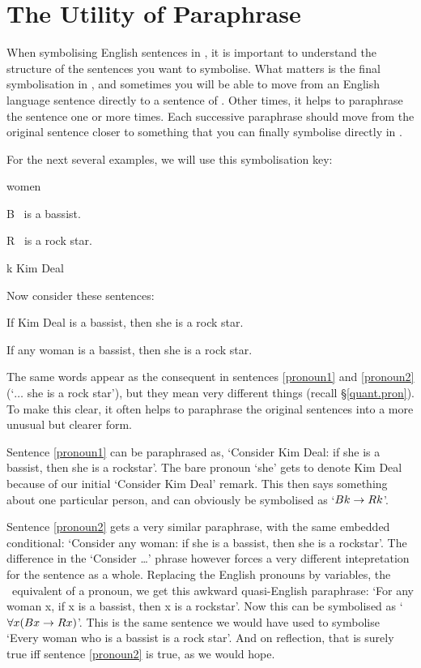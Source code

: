 \section{The Utility of Paraphrase}
When symbolising English sentences in \FOL, it is important to understand the structure of the sentences you want to symbolise. What matters is the final symbolisation in \FOL, and sometimes you will be able to move from an English language sentence directly to a sentence of \FOL. Other times, it helps to paraphrase the sentence one or more times. Each successive paraphrase should move from the original sentence closer to something that you can finally symbolise directly in \FOL.

For the next several examples, we will use this symbolisation key:
	\begin{ekey}
		\item[\text{domain}] women
		\item[B] \blank\ is a bassist.
		\item[R] \blank\ is a rock star.
		\item[k] Kim Deal
	\end{ekey}
Now consider these sentences:
	\begin{earg}
		\item[\ex{pronoun1}] If Kim Deal is a bassist, then she is a rock star.
		\item[\ex{pronoun2}] If any woman is a bassist, then she is a rock star.
	\end{earg}
The same words appear as the consequent in sentences \ref{pronoun1} and \ref{pronoun2} (`$…$ she is a rock star'), but they mean very different things (recall §\ref{quant.pron}). To make this clear, it often helps to paraphrase the original sentences into a more unusual but clearer form.

Sentence \ref{pronoun1} can be paraphrased as, `Consider Kim Deal: if she is a bassist, then she is a rockstar'. The bare pronoun `she' gets to denote Kim Deal because of our initial `Consider Kim Deal' remark. This then says something about one particular person, and can obviously be symbolised as `$Bk \rightarrow Rk$'.

Sentence \ref{pronoun2} gets a very similar paraphrase, with the same embedded conditional: `Consider any woman: if she is a bassist, then she is a rockstar'. The difference in the `Consider …' phrase however forces a very different intepretation for the sentence as a whole. Replacing the English pronouns by variables, the \FOL\ equivalent of a pronoun, we get this awkward quasi-English paraphrase: `For any woman x, if x is a bassist, then x is a rockstar'. Now this can be symbolised as `$\forall x (Bx \rightarrow Rx)$'. This is the same sentence we would have used to symbolise `Every woman who is a bassist is a rock star'. And on reflection, that is surely true iff sentence \ref{pronoun2} is true, as we would hope.

